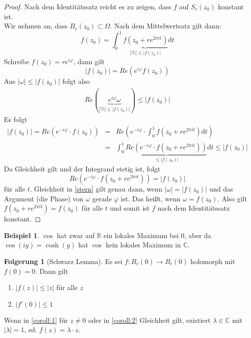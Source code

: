 \documentclass[11pt,titlepage]{article}
\theoremstyle{definition}
\newtheorem{corollary}[theorem]{Folgerung}
\newtheorem{example}[theorem]{Beispiel}
\theoremstyle{remark}
\begin{document}
	\begin{proof}
		Nach dem Identitätssatz reicht es zu zeigen, dass $f$ auf $S_r (z_0)$ konstant ist. \\
		Wir nehmen an, dass $\overline{B_r (z_0)}\subset\Omega$. Nach dem Mittelwertsatz gilt dann:
		\[ f(z_0)=\int_0^1 \underbrace{f(z_0 +re^{2\pi it})}_{|\%|\leq |f(z_0)|}\mathrm{d}t \]
		Schreibe $f(z_0)=re^{i\varphi}$, dann gilt 
		\[ |f(z_0)|= Re(e^{i\varphi}f(z_0)) \]
		Aus $|\omega|\leq|f(z_0)|$ folgt also 
		\begin{eqnarray}
			Re(\underbrace{e^{i\varphi}\omega}_{|\%|\leq |f(z_0)|})\leq |f(z_0)| \label{stern}
		\end{eqnarray}
		Es folgt 
		\begin{eqnarray*}
			|f(z_0)|=Re(e^{-i\varphi}\cdot f(z_0)) &=& 
			Re\left(e^{-i\varphi}\cdot \int_0^1 f(z_0 +re^{2\pi it})\mathrm{d}t\right) \\
			&=& \int_0^1 \underbrace{Re(e^{-i\varphi}\cdot f(z_0 +re^{2\pi it}))}_{\leq |f(z_0)|}
			\mathrm{d}t \leq |f(z_0)|
		\end{eqnarray*}
		Da Gleichheit gilt und der Integrand stetig ist, folgt
		\[ Re\left( e^{-i\varphi} \cdot f(z_0 +re^{2\pi it})\right) =|f(z_0)| \]
		für alle $t$. Gleichheit in \ref{stern} gilt genau dann, wenn $|\omega|=|f(z_0)|$ und das 
		Argument (die Phase) von $\omega$ gerade $\varphi$ ist. Das heißt, wenn $\omega =f(z_0)$. 
		Also gilt $f(z_0 +re^{2\pi it})=f(z_0)$ für alle $t$ und somit ist $f$ nach dem Identitätssatz 
		konstant.
	\end{proof}
	
	\begin{example}
		$\cos$ hat zwar auf $\mathbb{R}$ ein lokales Maximum bei $0$, aber da 
		$\cos (iy)=\cosh(y)$ hat $\cos$ kein lokales Maximum in $\mathbb{C}$.
	\end{example}
	
	\begin{corollary}[Schwarz Lemma] \label{coroll:SL}
		Es sei $f:B_r (0)\to B_r(0)$ holomorph mit $f(0)=0$. Dann gilt
		\begin{enumerate}
			\item $|f(z)|\leq |z|$ für alle $z$ \label{coroll:1}
			\item $|f'(0)|\leq 1$ \label{coroll:2}
		\end{enumerate}
		Wenn in \ref{coroll:1} für $z\neq 0$ oder in \ref{coroll:2} Gleichheit gilt, existiert $\lambda\in
		\mathbb{C}$ mit $|\lambda|=1$, sd. $f(z)=\lambda\cdot z$.
	\end{corollary}
	
\end{document}

